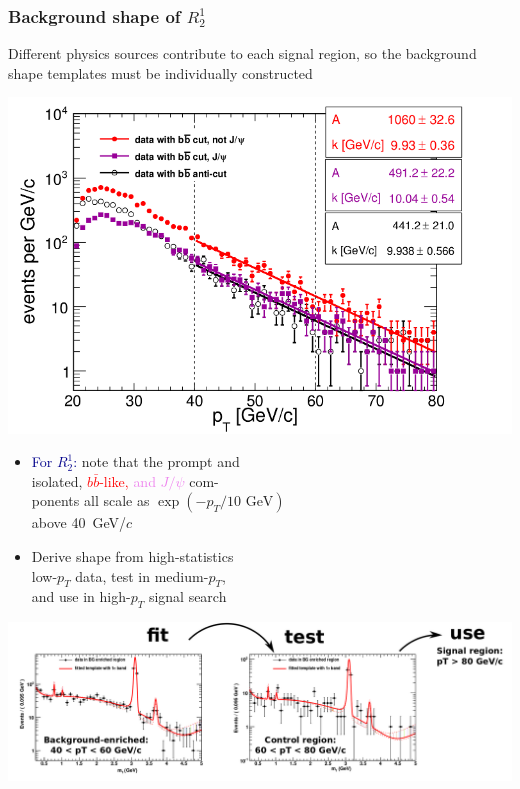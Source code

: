 \documentclass[compress]{beamer}
\begin{document}
\begin{frame}
\frametitle{Background shape of $R^1_2$}

Different physics sources contribute to each signal region, so
the background shape templates must be individually constructed

\hfill \mbox{\includegraphics[width=0.50\linewidth]{support_bbbarcut_limits.png}\hspace{-0.75 cm}}

\vspace{-3.8 cm}
\begin{itemize}
\item \textcolor{darkblue}{For $R^1_2$:} note that the prompt and \\ isolated, \textcolor{red}{$b\bar{b}$-like,} \textcolor{violet}{and $J/\psi$} com- \\ ponents all scale as {\scriptsize $\exp(-p_T/10\mbox{ GeV})$} \\ above 40~GeV/$c$

\item Derive shape from high-statistics \\ low-$p_T$ data, test in medium-$p_T$, \\ and use in high-$p_T$ signal search
\end{itemize}

\includegraphics[width=\linewidth]{background_shape_a1.png}
\end{frame}
\end{document}
